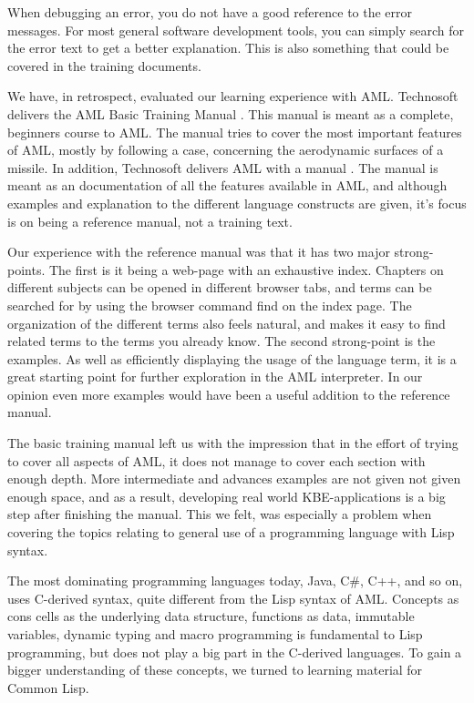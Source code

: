 When debugging an error, you do not have a good reference to the error messages. For most general software development tools, you can simply search for the error text to get a better explanation. This is also something that could be covered in the training documents.

We have, in retrospect, evaluated our learning experience with AML. Technosoft delivers the AML Basic Training Manual \cite{aml_ref}. This manual is meant as a complete, beginners course to AML. The manual tries to cover the most important features of AML, mostly by following a case, concerning the aerodynamic surfaces of a missile. In addition, Technosoft delivers AML with a manual \cite{AML}. The manual is meant as an documentation of all the features available in AML, and although examples and explanation to the different language constructs are given, it's focus is on being a reference manual, not a training text.

Our experience with the reference manual was that it has two major strong-points. The first is it being a web-page with an exhaustive index. Chapters on different subjects can be opened in different browser tabs, and terms can be searched for by using the browser command find on the index page. The organization of the different terms also feels natural, and makes it easy to find related terms to the terms you already know. The second strong-point is the examples. As well as efficiently displaying the usage of the language term, it is a great starting point for further exploration in the AML interpreter. In our opinion even more examples would have been a useful addition to the reference manual.

The basic training manual left us with the impression that in the effort of trying to cover all aspects of AML, it does not manage to cover each section with enough depth. More intermediate and advances examples are not given not given enough space, and as a result, developing real world KBE-applications is a big step after finishing the manual. This we felt, was especially a problem when covering the topics relating to general use of a programming language with Lisp syntax.

The most dominating programming languages today, Java, C\#, C++, and so on, uses C-derived syntax, quite different from the Lisp syntax of AML. Concepts as cons cells as the underlying data structure, functions as data, immutable variables, dynamic typing and macro programming is fundamental to Lisp programming, but does not play a big part in the C-derived languages. To gain a bigger understanding of these concepts, we turned to learning material for Common Lisp.

